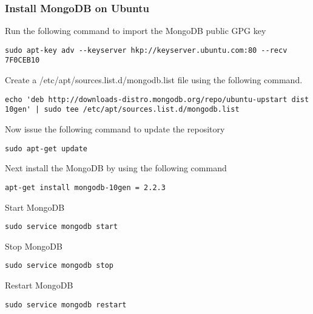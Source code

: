 \subsubsection{Install MongoDB on Ubuntu}

Run the following command to import the MongoDB public GPG key

\begin{lstlisting}
sudo apt-key adv --keyserver hkp://keyserver.ubuntu.com:80 --recv 7F0CEB10
\end{lstlisting}

Create a /etc/apt/sources.list.d/mongodb.list file using the following
command.

\begin{lstlisting}
echo 'deb http://downloads-distro.mongodb.org/repo/ubuntu-upstart dist 10gen' | sudo tee /etc/apt/sources.list.d/mongodb.list
\end{lstlisting}

Now issue the following command to update the repository

\begin{lstlisting}
sudo apt-get update
\end{lstlisting}

Next install the MongoDB by using the following command

\begin{lstlisting}
apt-get install mongodb-10gen = 2.2.3
\end{lstlisting}

Start MongoDB

\begin{lstlisting}
sudo service mongodb start
\end{lstlisting}

Stop MongoDB

\begin{lstlisting}
sudo service mongodb stop
\end{lstlisting}

Restart MongoDB

\begin{lstlisting}
sudo service mongodb restart
\end{lstlisting}

